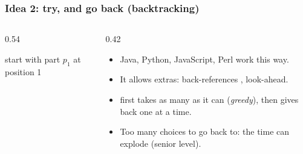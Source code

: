 \documentclass[aspectratio=169,10pt,compress]{beamer}
\begin{document}
\begin{frame}[t,fragile] \frametitle{Idea 2: try, and go back (backtracking)}
  \begin{columns}[T]
    \begin{column}{0.54\textwidth}


\begin{algorithm}[H]
  \caption{Matching by trying}
  start with part $p_{1}$ at position 1\;
\end{algorithm}

    \end{column}
    \begin{column}{0.42\textwidth}
      \begin{itemize}\small
        \item Java, Python, JavaScript, Perl work this way.
        \item It allows extras: back-references , look-ahead.
        \item {} first takes as many as it can (\emph{greedy}), then gives back one at a time.
        \item Too many choices to go back to: the time can explode (senior level).
      \end{itemize}
    \end{column}
  \end{columns}
\end{frame}
\end{document}
